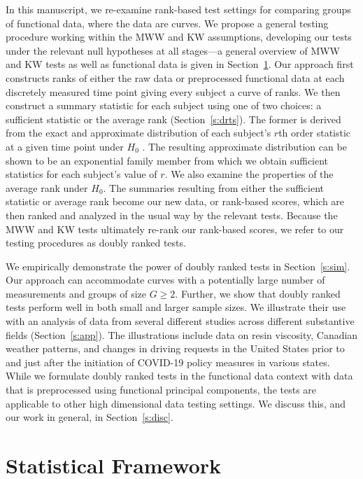 \documentclass[12pt]{article}
\theoremstyle{plain}
\theoremstyle{remark}
\begin{document}
	In this manuscript, we re-examine rank-based test settings for comparing groups of functional data, where the data are curves. We propose a general testing procedure working within the MWW and KW assumptions, developing our tests under the relevant null hypotheses at all stages---a general overview of MWW and KW tests as well as functional data is given in Section~\ref{s:statframe}. Our approach first constructs ranks of either the raw data or preprocessed functional data at each discretely measured time point giving every subject a curve of ranks. We then construct a summary statistic for each subject using one of two choices: a sufficient statistic or the average rank (Section~\ref{s:drts}). The former is derived from the exact and approximate distribution of each subject's $r$th order statistic at a given time point under $H_0$ . The resulting approximate distribution can be shown to be an exponential family member from which we obtain sufficient statistics for each subject's value of $r$. We also examine the properties of the average rank under $H_0$. The summaries resulting from either the sufficient statistic or average rank become our new data, or rank-based scores, which are then ranked and analyzed in the usual way by the relevant tests. Because the MWW and KW tests ultimately re-rank our rank-based scores, we refer to our testing procedures as doubly ranked tests.
	
	We empirically demonstrate the power of doubly ranked tests in Section~\ref{s:sim}. Our approach can accommodate curves with a potentially large number of measurements and groups of size $G \geq 2$. Further, we show that doubly ranked tests perform well in both small and larger sample sizes. We illustrate their use with an analysis of data from several different studies across different substantive fields (Section~\ref{s:app}). The illustrations include data on resin viscosity, Canadian weather patterns, and changes in driving requests in the United States prior to and just after the initiation of COVID-19 policy measures in various states. While we formulate doubly ranked tests in the functional data context with data that is preprocessed using functional principal components, the tests are applicable to other high dimensional data testing settings. We discuss this, and our work in general, in Section~\ref{s:disc}.
		
	\section{Statistical Framework}
	\label{s:statframe}
\end{document}
